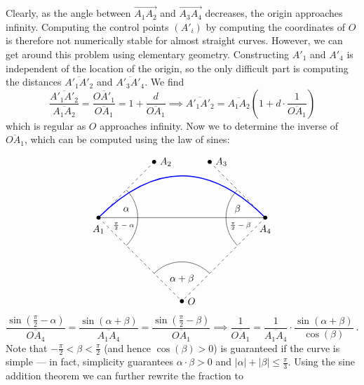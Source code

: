 \documentclass[12pt,a4paper]{article}
\theoremstyle{definition}
\begin{document}
Clearly, as the angle between $\overrightarrow{A_1A_2}$ and $\overrightarrow{A_3A_4}$ decreases, the origin approaches infinity. Computing the control points $(A'_i)$ by computing the coordinates of $O$ is therefore not numerically stable for almost straight curves. However, we can get around this problem using elementary geometry. Constructing $A'_1$ and $A'_4$ is independent of the location of the origin, so the only difficult part is computing the distances $\overline{A'_1A'_2}$ and $\overline{A'_3A'_4}$. We find
\begin{equation}
  \frac{\overline{A'_1A'_2}}{\overline{A_1A_2}} = \frac{\overline{OA'_1}}{\overline{OA_1}} = 1 + \frac{d}{\overline{OA_1}} \implies \overline{A'_1A'_2} = \overline{A_1A_2} \left(1 + d \cdot \frac{1}{\overline{OA_1}}\right)
\end{equation}
which is regular as $O$ approaches infinity. Now we to determine the inverse of $\overline{OA_1}$, which can be computed using the law of sines:
\[
\begin{tikzpicture}[every node/.append style={inner sep=1.5pt, circle, fill}]
  \coordinate (A1) at (-3, 0);
  \coordinate (A2) at (-1, 2);
  \coordinate (A3) at (1, 2);
  \coordinate (A4) at (3, 0);
  \coordinate (O) at (0, -3);
  \draw[dashed] (A1) -- (A2) (A3) -- (A4);
  \draw[dashed] (A1) -- (O) (A4) -- (O);
  \draw (A1) -- (A4);
  \draw (-2,-1) arc[start angle=-45, end angle=45, radius=1.41cm];
  \draw ( 2,-1) arc[start angle=180+45, end angle=180-45, radius=1.41cm];
  \draw (-1,-2) arc[start angle=180-45, end angle=45, radius=1.41cm];
  \draw[line width=1pt, blue] (A1) .. controls (A2) and (A3) .. (A4);
  \node[label={below:$A_1$}] at (A1) {};
  \node[label={right:$A_2$}] at (A2) {};
  \node[label={right:$A_3$}] at (A3) {};
  \node[label={below:$A_4$}] at (A4) {};
  \node[fill=none] at (-2,.3) {$\alpha$};
  \node[fill=none] at (-2.1,-.3) {\scriptsize$\frac{\pi}{2}-\alpha$};
  \node[fill=none] at ( 2,.3) {$\beta$};
  \node[fill=none] at ( 2.1,-.3) {\scriptsize$\frac{\pi}{2}-\beta$};
  \node[fill=none] at (0,-2.2) {$\alpha+\beta$};
  \node[label={right:$O$}] at (O) {};
\end{tikzpicture}
\]
\begin{equation}
  \frac{\sin(\tfrac{\pi}{2} - \alpha)}{\overline{OA_4}} = \frac{\sin(\alpha + \beta)}{\overline{A_1A_4}} = \frac{\sin(\tfrac{\pi}{2} - \beta)}{\overline{OA_1}} \implies \frac{1}{\overline{OA_1}} =  \frac{1}{\overline{A_1A_4}}\cdot\frac{\sin(\alpha + \beta)}{\cos(\beta)} \ .
\end{equation}
Note that $-\tfrac{\pi}{2} < \beta < \tfrac{\pi}{2}$ (and hence $\cos(\beta) > 0$) is guaranteed if the curve is simple --- in fact, simplicity guarantees $\alpha \cdot \beta > 0$ and $|\alpha| + |\beta| \leq \tfrac{\pi}{3}$. Using the sine addition theorem we can further rewrite the fraction to
\end{document}
